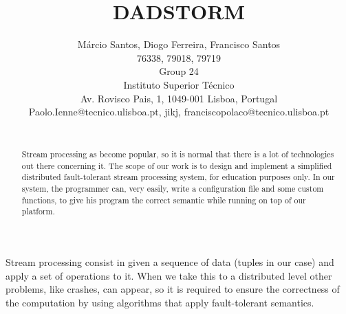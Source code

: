 \documentclass[times, 10pt,twocolumn]{article}
\begin{document}
\title{DADSTORM}

\author{Márcio Santos, Diogo Ferreira, Francisco Santos\\
76338, 79018, 79719\\Group 24\\Instituto Superior Técnico \\ Av. Rovisco Pais, 1, 1049-001 Lisboa, Portugal\\ Paolo.Ienne@tecnico.ulisboa.pt, jikj, franciscopolaco@tecnico.ulisboa.pt\\
\\}

\maketitle
\thispagestyle{empty}

\begin{abstract}
	Stream processing as become popular, so it is normal that there is a lot of technologies out there concerning it.
	The scope of our work is to design and implement a simplified distributed fault-tolerant stream processing system, for education purposes only.
	In our system, the programmer can, very easily, write a configuration file and some custom functions, to give his program the correct semantic while running on top of our platform.
\end{abstract}




Stream processing consist in given a sequence of data (tuples in our case) and apply a set of operations to it. When we take this to a distributed level other problems, like crashes, can appear,
 so it is required to ensure the correctness of the computation by using algorithms that apply fault-tolerant semantics.
 
\end{document}
